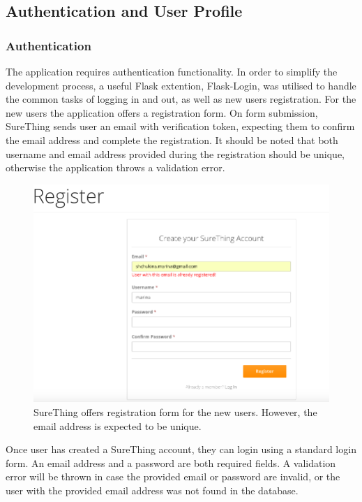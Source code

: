 \subsection{Authentication and User Profile}

\subsubsection*{Authentication}
The application requires authentication functionality. In order to simplify the development process, a useful Flask extention, Flask-Login, was utilised to handle the common tasks of logging in and out, as well as new users registration. For the new users the application offers a registration form. On form submission, SureThing sends user an email with verification token, expecting them to confirm the email address and complete the registration. It should be noted that both username and email address provided during the registration should be unique, otherwise the application throws a validation error.

\begin{figure}[H]
	\begin{center}
		\includegraphics[width=.90\textwidth]{impl/images/registrationFormError}
		\caption{SureThing offers registration form for the new users. However, the email address is expected to be unique.} \label{fig:registrationformerror}
	\end{center}
\end{figure}

Once user has created a SureThing account, they can login using a standard login form.  An email address and a password are both required fields. A validation error will be thrown in case the provided email or password are invalid, or the user with the provided email address was not found in the database.

